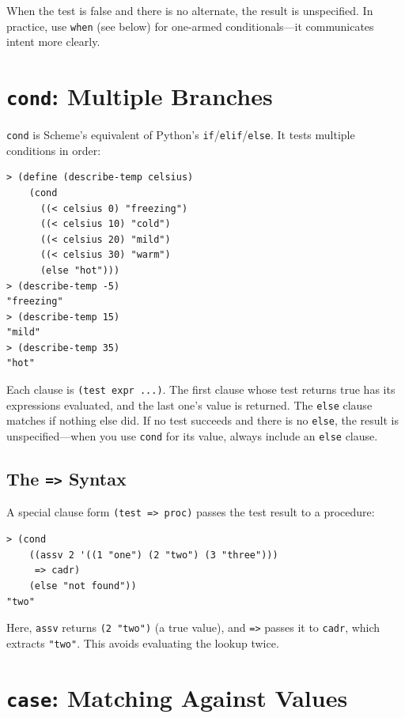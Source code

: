 When the test is false and there is no alternate, the result is unspecified. In practice, use \texttt{when} (see below) for one-armed conditionals---it communicates intent more clearly.

\section{\texttt{cond}: Multiple Branches}

\texttt{cond} is Scheme's equivalent of Python's \texttt{if}/\texttt{elif}/\texttt{else}. It tests multiple conditions in order:

\begin{lstlisting}[style=repl]
> (define (describe-temp celsius)
    (cond
      ((< celsius 0) "freezing")
      ((< celsius 10) "cold")
      ((< celsius 20) "mild")
      ((< celsius 30) "warm")
      (else "hot")))
> (describe-temp -5)
"freezing"
> (describe-temp 15)
"mild"
> (describe-temp 35)
"hot"
\end{lstlisting}

Each clause is \texttt{(test expr ...)}. The first clause whose test returns true has its expressions evaluated, and the last one's value is returned. The \texttt{else} clause matches if nothing else did. If no test succeeds and there is no \texttt{else}, the result is unspecified---when you use \texttt{cond} for its value, always include an \texttt{else} clause.

\subsection{The \texttt{=>} Syntax}

A special clause form \texttt{(test => proc)} passes the test result to a procedure:

\begin{lstlisting}[style=repl]
> (cond
    ((assv 2 '((1 "one") (2 "two") (3 "three")))
     => cadr)
    (else "not found"))
"two"
\end{lstlisting}

Here, \texttt{assv} returns \texttt{(2 "two")} (a true value), and \texttt{=>} passes it to \texttt{cadr}, which extracts \texttt{"two"}. This avoids evaluating the lookup twice.

\section{\texttt{case}: Matching Against Values}

